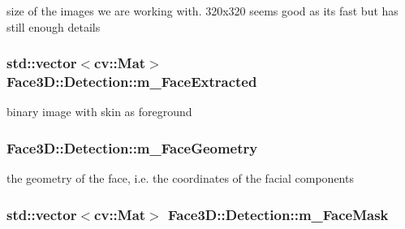 size of the images we are working with. 320x320 seems good as its fast but has still enough details 

\subsubsection[{\texorpdfstring{m\+\_\+\+Face\+Extracted}{m_FaceExtracted}}]{\setlength{\rightskip}{0pt plus 5cm}std\+::vector$<$cv\+::\+Mat$>$ Face3\+D\+::\+Detection\+::m\+\_\+\+Face\+Extracted\hspace{0.3cm}{\ttfamily [private]}}\hypertarget{class_face3_d_1_1_detection_a835e20dfe0fc3c9cee63168c4467dd82}{}\label{class_face3_d_1_1_detection_a835e20dfe0fc3c9cee63168c4467dd82}


binary image with skin as foreground 

\subsubsection[{\texorpdfstring{m\+\_\+\+Face\+Geometry}{m_FaceGeometry}}]{ Face3\+D\+::\+Detection\+::m\+\_\+\+Face\+Geometry\hspace{0.3cm}{\ttfamily [private]}}\hypertarget{class_face3_d_1_1_detection_a4eed1e18b8465d43d75102bf10ce8575}{}\label{class_face3_d_1_1_detection_a4eed1e18b8465d43d75102bf10ce8575}


the geometry of the face, i.\+e. the coordinates of the facial components 

\subsubsection[{\texorpdfstring{m\+\_\+\+Face\+Mask}{m_FaceMask}}]{\setlength{\rightskip}{0pt plus 5cm}std\+::vector$<$cv\+::\+Mat$>$ Face3\+D\+::\+Detection\+::m\+\_\+\+Face\+Mask\hspace{0.3cm}{\ttfamily [private]}}\hypertarget{class_face3_d_1_1_detection_a4dff33b175f5b2aff949db62e4c95b88}{}\label{class_face3_d_1_1_detection_a4dff33b175f5b2aff949db62e4c95b88}


